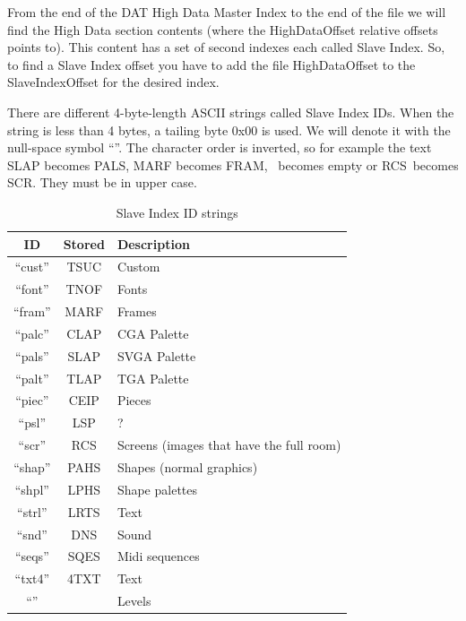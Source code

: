 \documentclass{article}
\begin{document}
 From the end of the  DAT High Data Master Index to the end of the file
 we will find the High Data section contents (where the HighDataOffset
 relative offsets points to). This content has a set of second indexes
 each called Slave Index. So, to find a Slave Index offset you have to
 add the file HighDataOffset to the SlaveIndexOffset for the desired
 index.

 There are different 4-byte-length ASCII strings called Slave Index IDs.
 When the string is less than 4 bytes, a tailing byte 0x00 is used. We will
 denote it with the null-space symbol ``\textvisiblespace''. The character order is inverted, so
 for example the text SLAP becomes PALS, MARF becomes FRAM, \textvisiblespace\textvisiblespace\textvisiblespace\textvisiblespace
 \ becomes empty or RCS\textvisiblespace \ becomes SCR. They must be in upper case.

\begin{table}
\begin{tabular}{ccl}
\hline
 ID    & Stored& Description \\
\hline
 ``cust''& TSUC  & Custom  \\
 ``font''& TNOF  & Fonts \\
 ``fram''& MARF  & Frames \\
 ``palc''& CLAP  & CGA Palette \\
 ``pals''& SLAP  & SVGA Palette \index{palette} \\
 ``palt''& TLAP  & TGA Palette \\
 ``piec''& CEIP  & Pieces   \\
 ``psl'' & LSP\textvisiblespace  & ?  \\
 ``scr'' & RCS\textvisiblespace  & Screens (images that have the full room) \\
 ``shap''& PAHS  & Shapes (normal graphics) \\
 ``shpl''& LPHS  & Shape palettes \\
 ``strl''& LRTS  & Text \\
 ``snd'' & DNS\textvisiblespace  & Sound \\
 ``seqs''& SQES  & Midi sequences \\
 ``txt4''& 4TXT  & Text \\
 ``''    & \textvisiblespace\textvisiblespace\textvisiblespace\textvisiblespace  & Levels \\
\hline
\end{tabular}
\caption{Slave Index ID strings}
\label{slave indexes}
\end{table}
\end{document}
